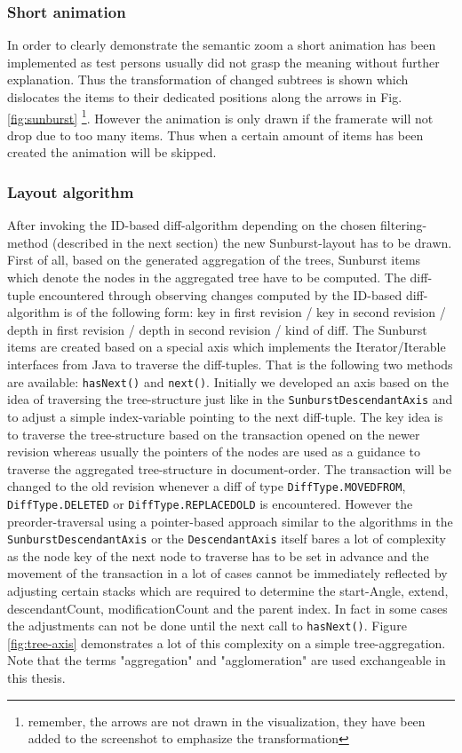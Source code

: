 \subsubsection{Short animation}
In order to clearly demonstrate the semantic zoom a short animation has been implemented as test persons usually did not grasp the meaning without further explanation. Thus the transformation of changed subtrees is shown which dislocates the items to their dedicated positions along the arrows in Fig. \ref{fig:sunburst} \footnote{remember, the arrows are not drawn in the visualization, they have been added to the screenshot to emphasize the transformation}. However the animation is only drawn if the framerate will not drop due to too many items. Thus when a certain amount of items has been created the animation will be skipped.

\subsubsection{Layout algorithm}
After invoking the ID-based diff-algorithm depending on the chosen filtering-method (described in the next section) the new Sunburst-layout has to be drawn. First of all, based on the generated aggregation of the trees, Sunburst items which denote the nodes in the aggregated tree have to be computed. The diff-tuple encountered through observing changes computed by the ID-based diff-algorithm is of the following form: key in first revision / key in second revision / depth in first revision / depth in second revision / kind of diff. The Sunburst items are created based on a special axis which implements the Iterator/Iterable interfaces from Java to traverse the diff-tuples. That is the following two methods are available: \texttt{hasNext()} and \texttt{next()}. Initially we developed an axis based on the idea of traversing the tree-structure just like in the \texttt{SunburstDescendantAxis} and to adjust a simple index-variable pointing to the next diff-tuple. The key idea is to traverse the tree-structure based on the transaction opened on the newer revision whereas usually the pointers of the nodes are used as a guidance to traverse the aggregated tree-structure in document-order. The transaction will be changed to the old revision whenever a diff of type \texttt{DiffType.MOVEDFROM}, \texttt{DiffType.DELETED} or \texttt{DiffType.REPLACEDOLD} is encountered. However the preorder-traversal using a pointer-based approach similar to the algorithms in the \texttt{SunburstDescendantAxis} or the \texttt{DescendantAxis} itself bares a lot of complexity as the node key of the next node to traverse has to be set in advance and the movement of the transaction in a lot of cases cannot be immediately reflected by adjusting certain stacks which are required to determine the start-Angle, extend, descendantCount, modificationCount and the parent index. In fact in some cases the adjustments can not be done until the next call to \texttt{hasNext()}. Figure \ref{fig:tree-axis} demonstrates a lot of this complexity on a simple tree-aggregation. Note that the terms "aggregation" and "agglomeration" are used exchangeable in this thesis. 

